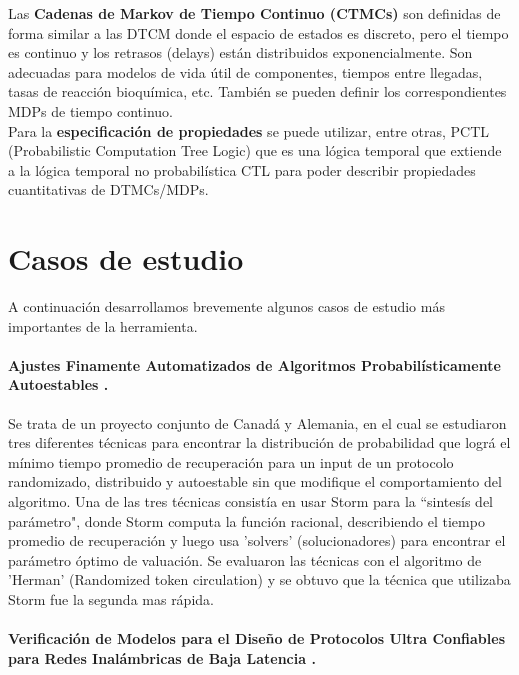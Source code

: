 \documentclass[11pt]{article}
\begin{document}
Las \textbf{Cadenas de Markov de Tiempo Continuo (CTMCs)} son definidas de forma similar a las DTCM donde el espacio de estados es discreto, pero el tiempo es continuo y los retrasos (delays) est\'an distribuidos exponencialmente. Son adecuadas para modelos de vida \'util de componentes, tiempos entre llegadas, tasas de reacci\'on bioqu\'imica, etc. Tambi\'en se pueden definir los correspondientes MDPs de tiempo continuo. \\


Para la \textbf{especificaci\'on de propiedades} se puede utilizar, entre otras, PCTL (Probabilistic Computation Tree Logic) que es una l\'ogica temporal que extiende a la l\'ogica temporal no probabil\'istica CTL para poder describir propiedades cuantitativas de DTMCs/MDPs.

\section{Casos de estudio}

A continuaci\'on desarrollamos brevemente algunos casos de estudio m\'as importantes de la herramienta.

\paragraph{Ajustes Finamente Automatizados de Algoritmos Probabil\'isticamente Autoestables \cite{Saba}.}

Se trata de un proyecto conjunto de Canad\'a y Alemania, en el cual se estudiaron tres diferentes t\'ecnicas para encontrar la distribuci\'on de probabilidad que logr\'a el m\'inimo tiempo promedio de recuperaci\'on para un input de un protocolo randomizado, distribuido y autoestable sin que modifique el comportamiento del algoritmo. Una de las tres t\'ecnicas consist\'ia en usar Storm para la ``sintes\'is del par\'ametro", donde Storm computa la funci\'on racional, describiendo el tiempo promedio de recuperaci\'on y luego usa 'solvers' (solucionadores) para encontrar el par\'ametro \'optimo de valuaci\'on. Se evaluaron las t\'ecnicas con el algoritmo de 'Herman' (Randomized token circulation) y se obtuvo que la t\'ecnica que utilizaba Storm fue la segunda mas r\'apida.

\paragraph{Verificaci\'on de Modelos para el Dise\~no de Protocolos Ultra Confiables para Redes Inal\'ambricas de Baja Latencia \cite{Christian}.}
\end{document}
